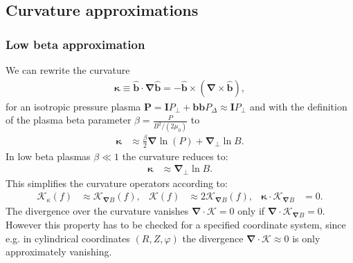 \documentclass{hitec} %
\renewcommand{\vec}[1]{\boldsymbol{#1}}
\begin{document}
\subsection{Curvature approximations}
\subsubsection{Low beta approximation}\label{sec:lowbetaapprox}
We can rewrite the curvature
\begin{align}
 \vec{\kappa} \equiv \vec{\hat{b}} \cdot \vec{\nabla} \vec{\hat{b}} = - \vec{\hat{b}} \times \left(\vec{\nabla} \times \vec{\hat{b}} \right) ,
\end{align}
for an isotropic pressure plasma \(\vec{P} = \vec{I} P_\perp + \vec{b} \vec{b} P_\Delta \approx \vec{I} P_\perp\) and with the definition of the plasma beta parameter 
\(\beta = \frac{P}{B^2/(2 \mu_0) } \) to
\begin{align}
 \vec{\kappa} &\approx \frac{\beta}{2} \vec{\nabla} \ln(P) +\vec{\nabla}_\perp \ln{B} .
\end{align}
In low beta plasmas \(\beta\ll1\) the curvature reduces to:
\begin{align}\label{eq:kappalowbeta}
 \vec{\kappa} & \approx \vec{\nabla}_\perp \ln{B} .
\end{align}
This simplifies the curvature operators according to:
\begin{align}
\mathcal{K}_{\kappa}(f)   &\approx  \mathcal{K}_{\vec{\nabla}  B}(f),  & 
\mathcal{K} (f) &\approx2 \mathcal{K}_{\vec{\nabla}  B} (f) , &
 \vec{\kappa} \cdot \vec{\mathcal{K}}_{\vec{\nabla}  B} &= 0.
\end{align}
The divergence over the curvature vanishes \( \vec{\nabla} \cdot \vec{ \mathcal{K} } = 0\) only if \( \vec{\nabla} \cdot \vec{ \mathcal{K}}_{\vec{\nabla}  B}   = 0\). 
However this property has to be checked for a specified coordinate system, since e.g. in cylindrical coordinates \((R,Z,\varphi)\) the divergence \( \vec{\nabla} \cdot \vec{ \mathcal{K} } \approx 0\) is only approximately vanishing.
\end{document}
